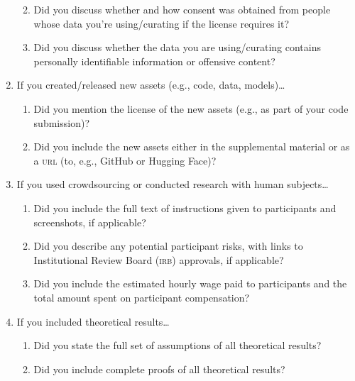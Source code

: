 \documentclass[11pt]{article}
\begin{document}
\begin{enumerate}
\begin{enumerate}
    \answerYes{}
  \item Did you discuss whether and how consent was obtained from people whose
    data you're using/curating if the license requires it?
    \answerNA{}
  \item Did you discuss whether the data you are using/curating contains
    personally identifiable information or offensive content?
    \answerNA{}
  \end{enumerate}
\item If you created/released new assets (e.g., code, data, models)\dots
  \begin{enumerate}
    \item Did you mention the license of the new assets (e.g., as part of your code submission)?
    \answerYes{}
    \item Did you include the new assets either in the supplemental material or as
    a \textsc{url} (to, e.g., GitHub or Hugging Face)?
  \end{enumerate}
\item If you used crowdsourcing or conducted research with human subjects\dots
  \begin{enumerate}
  \item Did you include the full text of instructions given to participants and
    screenshots, if applicable?
    \answerNA{}
  \item Did you describe any potential participant risks, with links to
    Institutional Review Board (\textsc{irb}) approvals, if applicable?
    \answerNA{}
  \item Did you include the estimated hourly wage paid to participants and the
    total amount spent on participant compensation?
    \answerNA{}
  \end{enumerate}
\item If you included theoretical results\dots
  \begin{enumerate}
  \item Did you state the full set of assumptions of all theoretical results?
    \answerNA{}
  \item Did you include complete proofs of all theoretical results?
    \answerNA{}
  \end{enumerate}
\end{enumerate}
\end{document}
